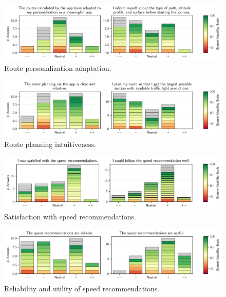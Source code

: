 \begin{figure}[t]
\caption{Route personalization adaptation.}\label{fig:route-personalization-adaptation}
\includegraphics[width=\linewidth]{images/app-usability-questions-route-personalization-adaptation.pdf}
\end{figure}
          

\begin{figure}[t]
\caption{Route planning intuitiveness.}\label{fig:route-planning-intuitiveness}
\includegraphics[width=\linewidth]{images/app-usability-questions-route-planning-intuitiveness.pdf}
\end{figure}
          

\begin{figure}[t]
\caption{Satisfaction with speed recommendations.}\label{fig:speed-recommendations-satisfaction}
\includegraphics[width=\linewidth]{images/app-usability-questions-speed-recommendations-satisfaction.pdf}
\end{figure}
          

\begin{figure}[t]
\caption{Reliability and utility of speed recommendations.}\label{fig:speed-recommendations-reliability}
\includegraphics[width=\linewidth]{images/app-usability-questions-speed-recommendations-reliability.pdf}
\end{figure}
          

